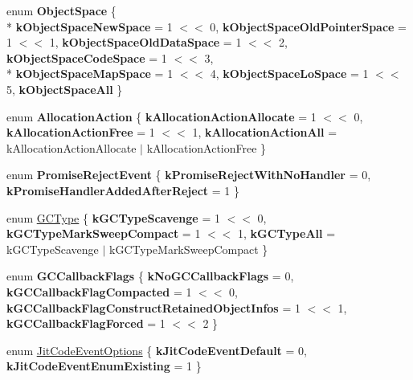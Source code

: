 \begin{DoxyCompactItemize}
\item 
\hypertarget{namespacev8_ae7bc5b0bd1100e94d78de255daa8ebc3}{}enum {\bfseries Object\+Space} \{ \\*
{\bfseries k\+Object\+Space\+New\+Space} = 1 $<$$<$ 0, 
{\bfseries k\+Object\+Space\+Old\+Pointer\+Space} = 1 $<$$<$ 1, 
{\bfseries k\+Object\+Space\+Old\+Data\+Space} = 1 $<$$<$ 2, 
{\bfseries k\+Object\+Space\+Code\+Space} = 1 $<$$<$ 3, 
\\*
{\bfseries k\+Object\+Space\+Map\+Space} = 1 $<$$<$ 4, 
{\bfseries k\+Object\+Space\+Lo\+Space} = 1 $<$$<$ 5, 
{\bfseries k\+Object\+Space\+All}
 \}\label{namespacev8_ae7bc5b0bd1100e94d78de255daa8ebc3}

\item 
\hypertarget{namespacev8_ae2b70dd2abba164d9ad9ffc9f757eca9}{}enum {\bfseries Allocation\+Action} \{ {\bfseries k\+Allocation\+Action\+Allocate} = 1 $<$$<$ 0, 
{\bfseries k\+Allocation\+Action\+Free} = 1 $<$$<$ 1, 
{\bfseries k\+Allocation\+Action\+All} = k\+Allocation\+Action\+Allocate $\vert$ k\+Allocation\+Action\+Free
 \}\label{namespacev8_ae2b70dd2abba164d9ad9ffc9f757eca9}

\item 
\hypertarget{namespacev8_a307b3674d4966684f8170a4fbd932eaf}{}enum {\bfseries Promise\+Reject\+Event} \{ {\bfseries k\+Promise\+Reject\+With\+No\+Handler} = 0, 
{\bfseries k\+Promise\+Handler\+Added\+After\+Reject} = 1
 \}\label{namespacev8_a307b3674d4966684f8170a4fbd932eaf}

\item 
enum \hyperlink{namespacev8_ac109d6f27e0c0f9ef4e98bcf7a806cf2}{G\+C\+Type} \{ {\bfseries k\+G\+C\+Type\+Scavenge} = 1 $<$$<$ 0, 
{\bfseries k\+G\+C\+Type\+Mark\+Sweep\+Compact} = 1 $<$$<$ 1, 
{\bfseries k\+G\+C\+Type\+All} = k\+G\+C\+Type\+Scavenge $\vert$ k\+G\+C\+Type\+Mark\+Sweep\+Compact
 \}
\item 
\hypertarget{namespacev8_a247c37a849f4d6c293b9b16e94e1944b}{}enum {\bfseries G\+C\+Callback\+Flags} \{ {\bfseries k\+No\+G\+C\+Callback\+Flags} = 0, 
{\bfseries k\+G\+C\+Callback\+Flag\+Compacted} = 1 $<$$<$ 0, 
{\bfseries k\+G\+C\+Callback\+Flag\+Construct\+Retained\+Object\+Infos} = 1 $<$$<$ 1, 
{\bfseries k\+G\+C\+Callback\+Flag\+Forced} = 1 $<$$<$ 2
 \}\label{namespacev8_a247c37a849f4d6c293b9b16e94e1944b}

\item 
enum \hyperlink{namespacev8_a06f34fa4fa4cfc8518366808d1d461c1}{Jit\+Code\+Event\+Options} \{ {\bfseries k\+Jit\+Code\+Event\+Default} = 0, 
{\bfseries k\+Jit\+Code\+Event\+Enum\+Existing} = 1
 \}
\end{DoxyCompactItemize}
